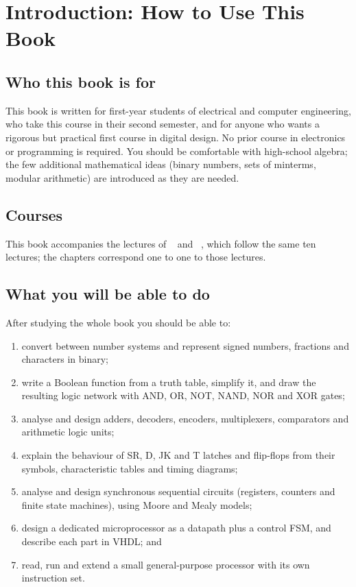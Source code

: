 \chapter*{Introduction: How to Use This Book}

\section*{Who this book is for}
This book is written for first-year students of electrical and computer engineering, who take this course in their second semester, and for anyone who wants a
rigorous but practical first course in digital design. No prior course in electronics or programming is required.
You should be comfortable with high-school algebra; the few additional mathematical ideas (binary numbers, sets of minterms, modular arithmetic) are introduced as they are needed.

\section*{Courses}
This book accompanies the lectures of \CourseCode\ \emph{\CourseName} and \CourseCodeB\ \emph{\CourseNameB}, which follow the same ten lectures; the chapters correspond one to one to those lectures.

\section*{What you will be able to do}
After studying the whole book you should be able to:
\begin{enumerate}[label=\arabic*.]
  \item convert between number systems and represent signed numbers, fractions and characters in binary;
  \item write a Boolean function from a truth table, simplify it, and draw the resulting logic network with AND, OR, NOT, NAND, NOR and XOR gates;
  \item analyse and design adders, decoders, encoders, multiplexers, comparators and arithmetic logic units;
  \item explain the behaviour of SR, D, JK and T latches and flip-flops from their symbols, characteristic tables and timing diagrams;
  \item analyse and design synchronous sequential circuits (registers, counters and finite state machines), using Moore and Mealy models;
  \item design a dedicated microprocessor as a datapath plus a control FSM, and describe each part in VHDL; and
  \item read, run and extend a small general-purpose processor with its own instruction set.
\end{enumerate}

